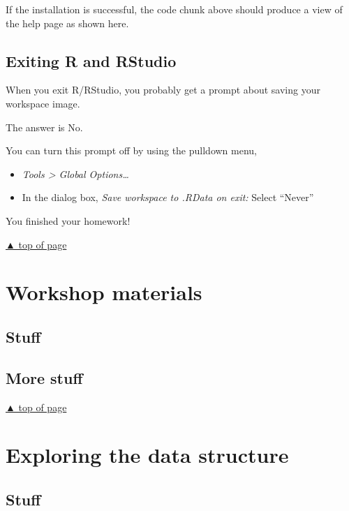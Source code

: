 \documentclass[
]{book}
\providecommand{\tightlist}{%
  \setlength{\itemsep}{0pt}\setlength{\parskip}{0pt}}
\begin{document}
If the installation is successful, the code chunk above should produce a view of the help page as shown here.

\hypertarget{exiting-r-and-rstudio}{%
\section{Exiting R and RStudio}\label{exiting-r-and-rstudio}}

When you exit R/RStudio, you probably get a prompt about saving your workspace image.

The answer is No.~

You can turn this prompt off by using the pulldown menu,

\begin{itemize}
\tightlist
\item
  \emph{Tools \textgreater{} Global Options\ldots{}}
\item
  In the dialog box, \emph{Save workspace to .RData on exit:} Select ``Never''
\end{itemize}

You finished your homework!

\protect\hyperlink{install-everything}{▲ top of page}

\hypertarget{materials}{%
\chapter{Workshop materials}\label{materials}}

\hypertarget{stuff}{%
\section{Stuff}\label{stuff}}

\hypertarget{more-stuff}{%
\section{More stuff}\label{more-stuff}}

\protect\hyperlink{materials}{▲ top of page}

\hypertarget{stories}{%
\chapter{Exploring the data structure}\label{stories}}

\hypertarget{stuff-1}{%
\section{Stuff}\label{stuff-1}}
\end{document}
